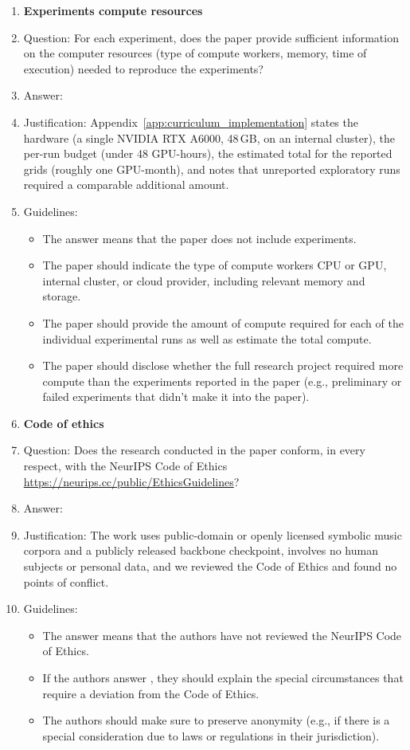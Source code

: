 \documentclass{article}
\begin{document}
\begin{enumerate}
\item {\bf Experiments compute resources}
    \item[] Question: For each experiment, does the paper provide sufficient information on the computer resources (type of compute workers, memory, time of execution) needed to reproduce the experiments?
    \item[] Answer: \answerYes{}
    \item[] Justification: Appendix~\ref{app:curriculum_implementation} states the hardware (a single NVIDIA RTX A6000, 48\,GB, on an internal cluster), the per-run budget (under 48 GPU-hours), the estimated total for the reported grids (roughly one GPU-month), and notes that unreported exploratory runs required a comparable additional amount.
    \item[] Guidelines:
    \begin{itemize}
        \item The answer \answerNA{} means that the paper does not include experiments.
        \item The paper should indicate the type of compute workers CPU or GPU, internal cluster, or cloud provider, including relevant memory and storage.
        \item The paper should provide the amount of compute required for each of the individual experimental runs as well as estimate the total compute. 
        \item The paper should disclose whether the full research project required more compute than the experiments reported in the paper (e.g., preliminary or failed experiments that didn't make it into the paper). 
    \end{itemize}
    
\item {\bf Code of ethics}
    \item[] Question: Does the research conducted in the paper conform, in every respect, with the NeurIPS Code of Ethics \url{https://neurips.cc/public/EthicsGuidelines}?
    \item[] Answer: \answerYes{}
    \item[] Justification: The work uses public-domain or openly licensed symbolic music corpora and a publicly released backbone checkpoint, involves no human subjects or personal data, and we reviewed the Code of Ethics and found no points of conflict.
    \item[] Guidelines:
    \begin{itemize}
        \item The answer \answerNA{} means that the authors have not reviewed the NeurIPS Code of Ethics.
        \item If the authors answer \answerNo, they should explain the special circumstances that require a deviation from the Code of Ethics.
        \item The authors should make sure to preserve anonymity (e.g., if there is a special consideration due to laws or regulations in their jurisdiction).
    \end{itemize}



\end{enumerate}
\end{document}
